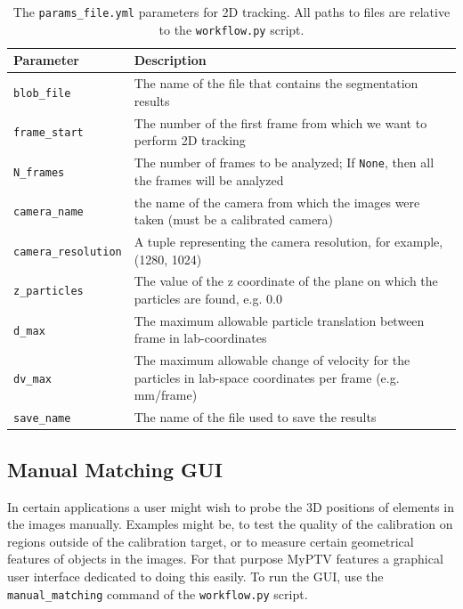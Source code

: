\documentclass[10pt,a4paper]{article}
\begin{document}
%
\begin{table}[!ht]
	\centering
	\caption{The \texttt{params\_file.yml} parameters for 2D tracking. All paths to files are relative to the \texttt{workflow.py} script. \label{tab:2d_tracking}}
	\begin{tabular}{l m{12cm}}
		\hline
		Parameter & Description\\[.2cm]
		\hline
		
		\texttt{blob\_file} & The name of the file that contains the segmentation results \\[.2cm]
		\texttt{frame\_start} & The number of the first frame from which we want to perform 2D tracking \\[.2cm]
		\texttt{N\_frames} & The number of frames to be analyzed; If \texttt{None}, then all the frames will be analyzed \\[.2cm]
		\texttt{camera\_name} & the name of the camera from which the images were taken (must be a calibrated camera) \\[.2cm]
		\texttt{camera\_resolution} & A tuple representing the camera resolution, for example, (1280, 1024) \\[.2cm]
		\texttt{z\_particles} & The value of the z coordinate of the plane on which the particles are found, e.g. 0.0 \\[.2cm]
		\texttt{d\_max} &  The maximum allowable particle translation between frame in lab-coordinates\\[.2cm]
		\texttt{dv\_max} & The maximum allowable change of velocity for the particles in lab-space coordinates per frame (e.g. mm/frame) \\[.2cm]
		\texttt{save\_name} & The name of the file used to save the results \\[.2cm]
		
		\hline
	\end{tabular}
\end{table}











\subsection{Manual Matching GUI} \label{sec:man_match}

In certain applications a user might wish to probe the 3D positions of elements in the images manually. Examples might be, to test the quality of the calibration on regions outside of the calibration target, or to measure certain geometrical features of objects in the images. For that purpose MyPTV features a graphical user interface dedicated to doing this easily. To run the GUI, use the \texttt{manual\_matching} command of the \texttt{workflow.py} script. 
\end{document}
